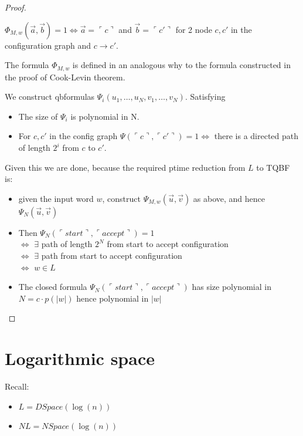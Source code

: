 \documentclass[a4paper,12pt]{article}
\theoremstyle{definition}
\theoremstyle{remark}
\begin{document}
\begin{proof}
\begin{itemize}
        $\Phi_{M, w}(\overrightarrow{a}, \overrightarrow{b}) = 1 \iff \overrightarrow{a} = \ulcorner c \urcorner$ and $\overrightarrow{b} = \ulcorner c' \urcorner$ for 2 node $c, c'$ in the configuration graph and $c \to c'$.
    \end{itemize}
    
    The formula $\Phi_{M, w}$ is defined in an analogous why to the formula constructed in the proof of Cook-Levin theorem.
    
    We construct qbformulas $\Psi_i (u_1, \dots, u_N, v_1, \dots, v_N)$. Satisfying
    \begin{itemize}
        \item The size of $\Psi_i$ is polynomial in N.
        \item For $c, c'$ in the config graph $\Psi(\ulcorner c \urcorner, \ulcorner c'\urcorner) = 1 \iff $ there is a directed path of length $2^i$ from $c$ to $c'$.
    \end{itemize}
    
    Given this we are done, because the required ptime reduction from $L$ to TQBF is:
    \begin{itemize}
        \item given the input word $w$, construct $\Psi_{M, w} (\vec{u}, \vec{v})$ as above, and hence $\Psi_N(\vec{u}, \vec{v})$
        \item Then $\Psi_N (\ulcorner start \urcorner, \ulcorner accept \urcorner) = 1$ \\
        $\iff$ $\exists$ path of length $2^N$ from start to accept configuration \\
        $\iff$ $\exists$ path from start to accept configuration \\
        $\iff$ $w \in L$
        \item The closed formula $\Psi_N (\ulcorner start \urcorner, \ulcorner accept \urcorner)$ has size polynomial in $N = c \cdot p(|w|)$ hence polynomial in $|w|$
    \end{itemize}
\end{proof}







\newpage
\section{Logarithmic space}
Recall:
\begin{itemize}
    \item $L = DSpace(\log(n))$
    \item $NL = NSpace(\log(n))$
\end{itemize}
\end{document}

